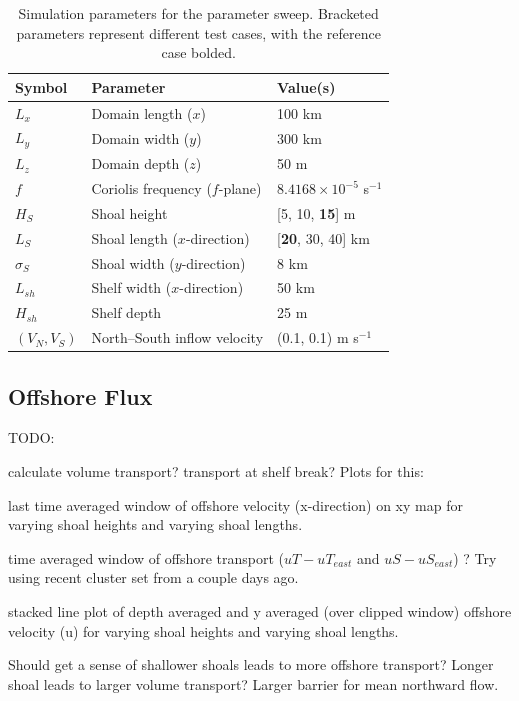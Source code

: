 \begin{table}[ht!]
  \centering
  \small
  \renewcommand{\arraystretch}{1.3}
  \caption{Simulation parameters for the parameter sweep. Bracketed parameters represent different test cases, with the reference case bolded.}
  \label{tab:params}
  \begin{tabular}{lll}   
    \toprule
    \textbf{Symbol} & \textbf{Parameter} & \textbf{Value(s)} \\
    \midrule
    $L_x$ & Domain length ($x$) & 100 km \\
    $L_y$ & Domain width ($y$) & 300 km \\
    $L_z$ & Domain depth ($z$) & 50 m \\
    $f$ & Coriolis frequency ($f$-plane) & $8.4168 \times 10^{-5}$ s$^{-1}$ \\
    $H_S$ & Shoal height & [5, 10, \textbf{15}] m \\
    $L_S$ & Shoal length ($x$-direction) & [\textbf{20}, 30, 40] km \\
    $\sigma_S$ & Shoal width ($y$-direction) & 8 km \\
    $L_{sh}$ & Shelf width ($x$-direction) & 50 km \\
    $H_{sh}$ & Shelf depth & 25 m \\
    $(V_N, V_S)$ & North--South inflow velocity & (0.1, 0.1) m s$^{-1}$ \\
    \bottomrule
  \end{tabular}
\end{table}

\subsection{Offshore Flux}


TODO: 

calculate volume transport? transport at shelf break? 
Plots for this: 

last time averaged window of offshore velocity (x-direction) on xy map for varying shoal heights and varying shoal lengths. 

time averaged window of offshore transport ($uT - uT_{east}$ and $uS - uS_{east}$) ? Try using recent cluster set from a couple days ago. 

stacked line plot of depth averaged and y averaged (over clipped window) offshore velocity (u) for varying shoal heights and varying shoal lengths. 

Should get a sense of shallower shoals leads to more offshore transport? 
Longer shoal leads to larger volume transport? 
Larger barrier for mean northward flow. 

